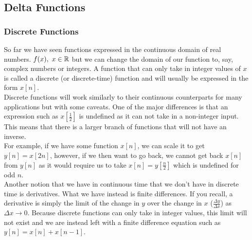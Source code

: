 \documentclass[11pt, fleqn]{article}
\begin{document}
\subsection{Delta Functions}
\subsubsection{Discrete Functions}
So far we have seen functions expressed in the continuous domain of real numbers. $f(x),\ x\in\mathbb{R}$ but we can change the domain of our function to, say, complex numbers or integers. A function that can only take in integer values of $x$ is called a discrete (or discrete-time) function and will usually be expressed in the form $x[n]$.\\
Discrete functions will work similarly to their continuous counterparts for many applications but with some caveats. One of the major differences is that an expression such as $x[\frac{1}{2}]$ is undefined as it can not take in a non-integer input.\\
This means that there is a larger branch of functions that will not have an inverse.\\
For example, if we have some function $x[n]$, we can scale it to get $y[n]=x[2n]$, however, if we then want to go back, we cannot get back $x[n]$ from $y[n]$ as it would require us to take $x[n]=y[\frac{n}{2}]$ which is undefined for odd $n$.\\
Another notion that we have in continuous time that we don't have in discrete time is derivatives. What we have instead is finite differences. If you recall, a derivative is simply the limit of the change in $y$ over the change in $x$ ($\frac{\Delta y}{\Delta x}$) as $\Delta x\to0$. Because discrete functions can only take in integer values, this limit will not exist and we are instead left with a finite difference equation such as $y[n]=x[n]+x[n-1]$.\\
\end{document}
